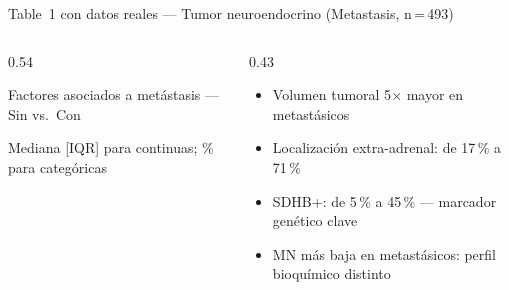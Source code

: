 \documentclass[aspectratio=169,10pt]{beamer}
\begin{document}
\begin{frame}{Table~1 con datos reales --- Tumor neuroendocrino (Metastasis, n\,=\,493)}
  \begin{columns}[T]
    \begin{column}{0.54\textwidth}
      \begin{block}{Factores asociados a metástasis --- Sin vs.\ Con}
  \centering
  \scriptsize
  \renewcommand{\arraystretch}{1.15}


  \vspace{1mm}
  {\scriptsize Mediana [IQR] para continuas; \% para categóricas}
\end{block}
    \end{column}
    \begin{column}{0.43\textwidth}
      \vspace{4mm}
      \begin{itemize}\small
        \item Volumen tumoral 5$\times$ mayor en metastásicos
        \item Localización extra-adrenal: de 17\,\% a 71\,\%
        \item SDHB+: de 5\,\% a 45\,\% --- marcador genético clave
        \item MN más baja en metastásicos: perfil bioquímico distinto
      \end{itemize}
      \vspace{4mm}
    \end{column}
  \end{columns}
\end{frame}
\end{document}
